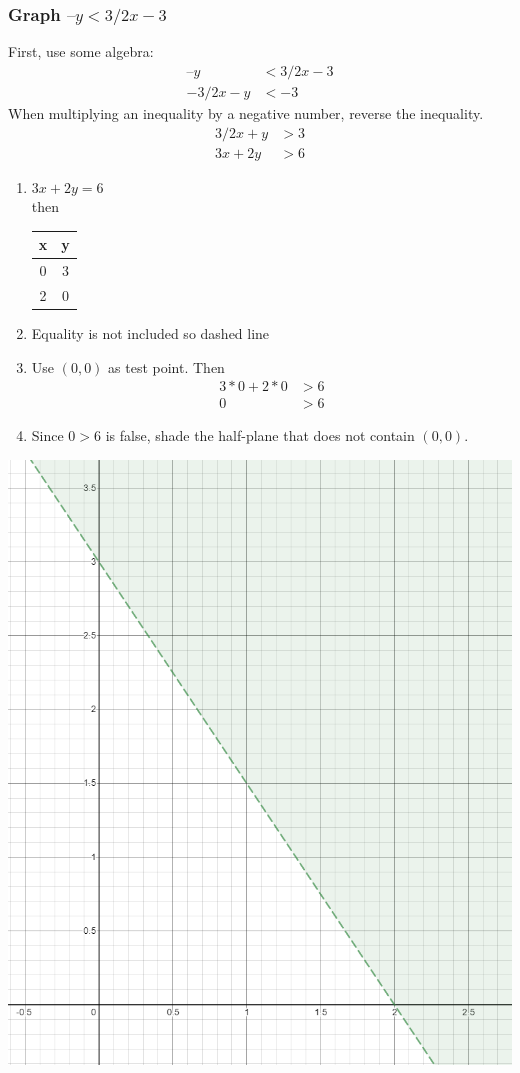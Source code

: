 \documentclass[14pt]{extarticle}
\begin{document}
\subsubsection*{Graph $–y < 3/2x -3$}
First, use some algebra:
\begin{align*}
	–y &< 3/2x -3 \\
	-3/2x - y &< -3
\end{align*}
When multiplying an inequality by a negative number, reverse the inequality.
\begin{align*}
	3/2x +y &>3 \\
	3x + 2y &>6
\end{align*}
\begin{enumerate}
	\item $3x + 2y =6$ \\ then 
	\begin{tabular}{c|c}
		x & y \\
		\hline
		0 & 3 \\
		2 & 0 \\
	\end{tabular}
	\item Equality is not included so dashed line
	\item Use $(0,0)$ as test point. Then 
	\begin{align*}
		3*0 + 2*0 &>6\\
		0 &> 6
	\end{align*}
	\item Since $0 >6$ is false, shade the half-plane that does not contain $(0,0)$.
\end{enumerate}
\begin{center}\includegraphics[width=0.5\linewidth]{5-1-2}\end{center}
\end{document}
